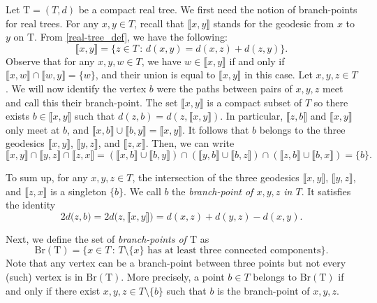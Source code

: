 \documentclass[11pt,reqno]{amsart}
\newcommand{\1}{\mathbf{1}}
\newcommand{\0}{\mathbf{0}}
\newcommand{\rT}{\mathrm{T}}
\begin{document}
Let $\rT=(T,d)$ be a compact real tree. We first need the notion of branch-points for real trees. For any $x,y\in T$, recall that $\llbracket x,y\rrbracket$ stands for the geodesic from $x$ to $y$ on $\rT$. From \cref{real-tree_def}, we have the following:
\begin{equation}
\label{geo_distance}
\llbracket x,y\rrbracket=\{z\in T\, :\, d(x,y)=d(x,z)+d(z,y)\}.
\end{equation}
Observe that for any $x,y,w\in T$, we have $w\in\llbracket x,y\rrbracket$ if and only if $\llbracket x,w\rrbracket \cap \llbracket w,y\rrbracket = \{w\}$, and their union is equal to $\llbracket x,y\rrbracket$ in this case.
Let $x,y,z\in T$. We will now identify the vertex $b$ were the paths between pairs of $x,y,z$ meet and call this their branch-point. The set $\llbracket x,y\rrbracket$ is a compact subset of $T$ so there exists $b\in \llbracket x,y\rrbracket$ such that $d(z,b)=d(z,\llbracket x,y\rrbracket)$. In particular, $\llbracket z,b\rrbracket$ and $\llbracket x,y\rrbracket$ only meet at $b$, and $\llbracket x,b\rrbracket\cup\llbracket b,y\rrbracket=\llbracket x,y\rrbracket$. It follows that $b$ belongs to the three geodesics $\llbracket x,y\rrbracket$, $\llbracket y,z\rrbracket$, and $\llbracket z,x\rrbracket$. Then, we can write
\[\llbracket x,y\rrbracket\cap \llbracket y,z \rrbracket \cap\llbracket z,x\rrbracket=(\llbracket x,b\rrbracket\cup \llbracket b,y\rrbracket)\cap (\llbracket y,b\rrbracket\cup \llbracket b,z\rrbracket) \cap (\llbracket z,b\rrbracket\cup \llbracket b,x\rrbracket)=\{b\}.\]

To sum up, for any $x,y,z\in T$, the intersection of the three geodesics $\llbracket x,y\rrbracket$, $\llbracket y,z\rrbracket$, and $\llbracket z,x\rrbracket$ is a singleton $\{b\}$. We call $b$ the \emph{branch-point of $x,y,z$ in $T$}. It satisfies the identity
\begin{equation}
\label{distance-to-branch-point}
2d\big(z,b\big)=2d\big(z,\llbracket x,y\rrbracket\big)=d(x,z)+d(y,z)-d(x,y).
\end{equation}

Next, we define the set of \emph{branch-points of $\rT$} as 
\[\mathrm{Br}(\rT)=\{x\in T\, :\, T\setminus\{x\}\text{ has at least three connected components}\}.\]
Note that any vertex can be a branch-point between three points but not every (such) vertex is in $\mathrm{Br}(\rT)$. More precisely, a point $b\in T$ belongs to $\mathrm{Br}(\rT)$ if and only if there exist $x,y,z\in T\setminus\{b\}$ such that $b$ is the branch-point of $x,y,z$.
\smallskip
\end{document}
